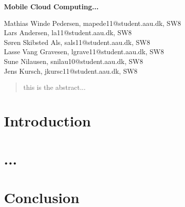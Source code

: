 \documentclass[12pt,a4paper]{article}
\begin{document}
\begin{center}
\bigskip\bigskip
{\Large\bf Mobile Cloud Computing...}
\bigskip\bigskip


Mathias Winde Pedersen, mapede11@student.aau.dk, SW8\\
Lars Andersen, la11@student.aau.dk, SW8\\
Søren Skibsted Als, sals11@student.aau.dk, SW8\\
Lasse Vang Gravesen, lgrave11@student.aau.dk, SW8\\
Sune Nilausen, snilau10@student.aau.dk, SW8\\
Jens Kursch, jkursc11@student.aau.dk, SW8

\bigskip
\begin{abstract}
this is the abstract...
\end{abstract}

\thispagestyle{empty}
\end{center}


\titlepage



\thispagestyle{plain}


\section{Introduction}

\section{...}



\section{Conclusion}




\end{document}
